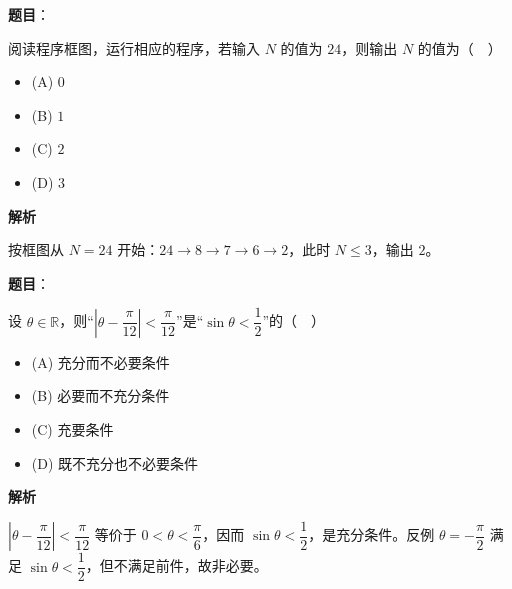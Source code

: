 \begin{answer}

\textbf{题目}：

阅读程序框图，运行相应的程序，若输入 $N$ 的值为 $24$，则输出 $N$ 的值为（　）
\nopagebreak[4]
\begin{center}\end{center}
\nopagebreak[4]
\begin{itemize}
\item (A) $0$
\item (B) $1$
\item (C) $2$
\item (D) $3$
\end{itemize}

\textbf{解析}

按框图从 $N=24$ 开始：$24\to8\to7\to6\to2$，此时 $N\leqslant3$，输出 $2$。


\end{answer}
\begin{answer}

\textbf{题目}：

设 $\theta\in\mathbb R$，则“$\left|\theta-\dfrac\pi{12}\right|<\dfrac\pi{12}$”是“$\sin\theta<\dfrac12$”的（　）

\begin{itemize}
\item (A) 充分而不必要条件
\item (B) 必要而不充分条件
\item (C) 充要条件
\item (D) 既不充分也不必要条件
\end{itemize}

\textbf{解析}

$\left|\theta-\dfrac\pi{12}\right|<\dfrac\pi{12}$ 等价于 $0<\theta<\dfrac\pi6$，因而 $\sin\theta<\dfrac12$，是充分条件。反例 $\theta=-\dfrac\pi2$ 满足 $\sin\theta<\dfrac12$，但不满足前件，故非必要。


\end{answer}
